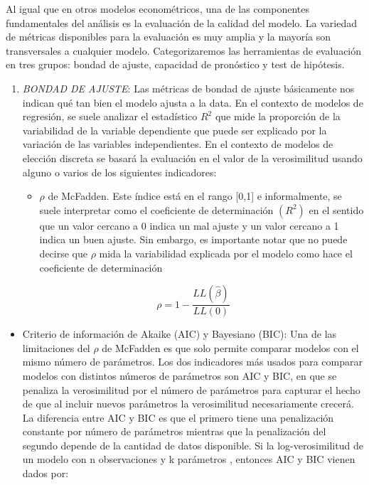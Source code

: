 \documentclass[
]{book}
\providecommand{\tightlist}{%
  \setlength{\itemsep}{0pt}\setlength{\parskip}{0pt}}
\begin{document}
Al igual que en otros modelos econométricos, una de las componentes fundamentales del análisis es la evaluación de la calidad del modelo. La variedad de métricas disponibles para la evaluación es muy amplia y la mayoría son transversales a cualquier modelo. Categorizaremos las herramientas de evaluación en tres grupos: bondad de ajuste, capacidad de pronóstico y test de hipótesis.

\begin{enumerate}
\def\labelenumi{\arabic{enumi}.}
\item
  \emph{BONDAD DE AJUSTE}: Las métricas de bondad de ajuste básicamente nos indican qué tan bien el modelo ajusta a la data. En el contexto de modelos de regresión, se suele analizar el estadístico \(R^2\) que mide la proporción de la variabilidad de la variable dependiente que puede ser explicado por la variación de las variables independientes. En el contexto de modelos de elección discreta se basará la evaluación en el valor de la verosimilitud usando alguno o varios de los siguientes indicadores:

  \begin{itemize}
  \tightlist
  \item
    \(\rho\) de McFadden. Este índice está en el rango {[}0,1{]} e informalmente, se suele interpretar como el coeficiente de determinación \((R^2)\) en el sentido que un valor cercano a 0 indica un mal ajuste y un valor cercano a 1 indica un buen ajuste. Sin embargo, es importante notar que no puede decirse que \(\rho\) mida la variabilidad explicada por el modelo como
    hace el coeficiente de determinación
  \end{itemize}

  \begin{equation}
   \rho=1 - \frac{LL(\hat{\beta})}{LL(0)}
   \label{eq:rho}
   \end{equation}
\end{enumerate}

\begin{itemize}
\tightlist
\item
  Criterio de información de Akaike (AIC) y Bayesiano (BIC): Una de las limitaciones del \(\rho\) de McFadden es que solo permite comparar modelos con el mismo número de parámetros. Los dos indicadores más usados para comparar modelos con distintos números de parámetros son AIC y BIC, en que se penaliza la verosimilitud por el número de parámetros para capturar el hecho de que al incluir nuevos parámetros la verosimilitud necesariamente crecerá. La diferencia entre AIC y BIC es que el primero tiene una penalización constante por número de parámetros mientras que la penalización del segundo depende de la cantidad de datos disponible. Si la log-verosimilitud de un modelo con n observaciones y k parámetros , entonces AIC y BIC vienen dados por:
\end{itemize}
\end{document}
